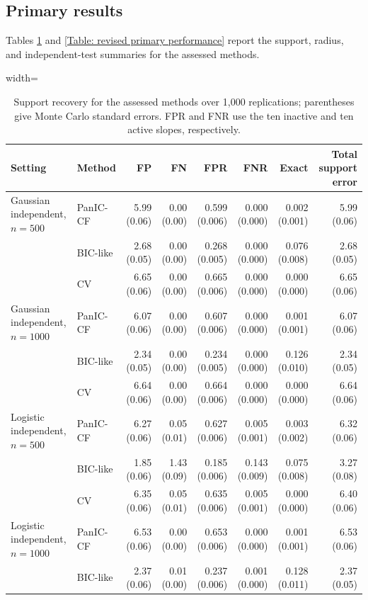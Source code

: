 \documentclass[12pt]{article}
\newenvironment{bluechange}{\begingroup\color[rgb]{0.00,0.00,1.00}}{\endgroup}
\theoremstyle{remark}
\theoremstyle{plain}
\begin{document}
\begin{bluechange}
\subsection{Primary results}\label{Sect: Discussion}
Tables \ref{Table: revised primary support} and
\ref{Table: revised primary performance} report the support, radius, and
independent-test summaries for the assessed methods.
\begin{table}[H]
\centering
\caption{Support recovery for the assessed methods over 1,000 replications; parentheses give Monte Carlo standard errors. FPR and FNR use the ten inactive and ten active slopes, respectively.}
\label{Table: revised primary support}
\begin{adjustbox}{width=\textwidth}
\scriptsize
\begin{tabular}{llrrrrrr}
\hline
Setting & Method & FP & FN & FPR & FNR & Exact & Total support error \\
\hline
Gaussian independent, $n=500$ & PanIC-CF & 5.99 (0.06) & 0.00 (0.00) & 0.599 (0.006) & 0.000 (0.000) & 0.002 (0.001) & 5.99 (0.06) \\
 & BIC-like & 2.68 (0.05) & 0.00 (0.00) & 0.268 (0.005) & 0.000 (0.000) & 0.076 (0.008) & 2.68 (0.05) \\
 & CV & 6.65 (0.06) & 0.00 (0.00) & 0.665 (0.006) & 0.000 (0.000) & 0.000 (0.000) & 6.65 (0.06) \\
Gaussian independent, $n=1000$ & PanIC-CF & 6.07 (0.06) & 0.00 (0.00) & 0.607 (0.006) & 0.000 (0.000) & 0.001 (0.001) & 6.07 (0.06) \\
 & BIC-like & 2.34 (0.05) & 0.00 (0.00) & 0.234 (0.005) & 0.000 (0.000) & 0.126 (0.010) & 2.34 (0.05) \\
 & CV & 6.64 (0.06) & 0.00 (0.00) & 0.664 (0.006) & 0.000 (0.000) & 0.000 (0.000) & 6.64 (0.06) \\
Logistic independent, $n=500$ & PanIC-CF & 6.27 (0.06) & 0.05 (0.01) & 0.627 (0.006) & 0.005 (0.001) & 0.003 (0.002) & 6.32 (0.06) \\
 & BIC-like & 1.85 (0.06) & 1.43 (0.09) & 0.185 (0.006) & 0.143 (0.009) & 0.075 (0.008) & 3.27 (0.08) \\
 & CV & 6.35 (0.06) & 0.05 (0.01) & 0.635 (0.006) & 0.005 (0.001) & 0.000 (0.000) & 6.40 (0.06) \\
Logistic independent, $n=1000$ & PanIC-CF & 6.53 (0.06) & 0.00 (0.00) & 0.653 (0.006) & 0.000 (0.000) & 0.001 (0.001) & 6.53 (0.06) \\
 & BIC-like & 2.37 (0.06) & 0.01 (0.00) & 0.237 (0.006) & 0.001 (0.000) & 0.128 (0.011) & 2.37 (0.05) \\

\end{tabular}
\end{adjustbox}
\end{table}
\end{bluechange}
\end{document}
